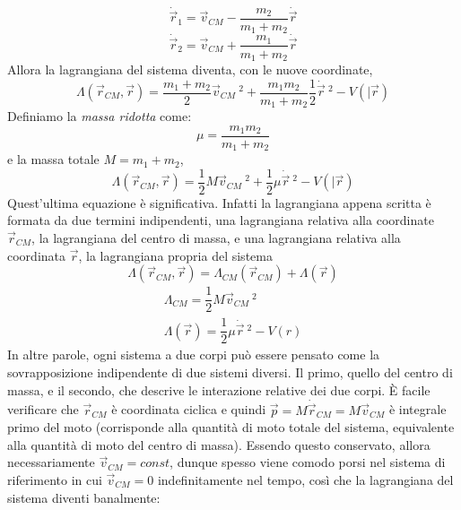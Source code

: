 \documentclass[a4paper,openany]{article}
\begin{document}
	\begin{equation}\label{key}
		\dot{\vec{r}}_1 = \vec{v}_{CM} - \dfrac{m_2}{m_1+m_2}\dot{\vec{r}}
	\end{equation}
	\begin{equation*}\label{key}
		\dot{\vec{r}}_2 = \vec{v}_{CM} + \dfrac{m_1}{m_1+m_2}\dot{\vec{r}}
	\end{equation*}
	Allora la lagrangiana del sistema diventa, con le nuove coordinate,
	\begin{equation}\label{key}
		\Lambda(\vec{r}_{CM},\vec{r}) = \dfrac{m_1+m_2}{2}\vec{v}_{CM}\>^{2} + \dfrac{m_1 m_2}{m_1 + m_2} \dfrac{1}{2} \dot{\vec{r}}\>^{2} - V(|\vec{r})
	\end{equation}
	Definiamo la \textit{massa ridotta} come:
	$$
	\mu = \dfrac{m_1 m_2}{m_1+m_2}
	$$
	e la massa totale $M = m_1+m_2$,
	\begin{equation}\label{key}
		\Lambda(\vec{r}_{CM},\vec{r}) = \dfrac{1}{2}M\vec{v}_{CM}\>^{2} + \dfrac{1}{2} \mu \dot{\vec{r}}\>^{2} - V(|\vec{r})
	\end{equation}
	Quest'ultima equazione è significativa. Infatti la lagrangiana appena scritta è formata da due termini indipendenti, una lagrangiana relativa alla coordinate $\vec{r}_{CM}$, la lagrangiana del centro di massa, e una lagrangiana relativa alla coordinata $\vec{r}$, la lagrangiana propria del sistema
	\begin{equation}\label{key}
		\Lambda(\vec{r}_{CM},\vec{r}) = \Lambda_{CM}(\vec{r}_{CM}) + \Lambda(\vec{r})
	\end{equation}
	\begin{equation}\label{key}
		\begin{aligned}
			\Lambda_{CM} = \dfrac{1}{2}M\vec{v}_{CM}\>^{2} \\
			\Lambda(\vec{r}) = \dfrac{1}{2}\mu\dot{\vec{r}}\>^{2} - V(r)
		\end{aligned}
	\end{equation}
	In altre parole, ogni sistema a due corpi può essere pensato come la sovrapposizione indipendente di due sistemi diversi. Il primo, quello del centro di massa, e il secondo, che descrive le interazione relative dei due corpi. È facile verificare che $\vec{r}_{CM}$ è coordinata ciclica e quindi $\vec{p} = M\dot{\vec{r}}_{CM} = M\vec{v}_{CM}$ è integrale primo del moto (corrisponde alla quantità di moto totale del sistema, equivalente alla quantità di moto del centro di massa). Essendo questo conservato, allora necessariamente $\vec{v}_{CM} = const$, dunque spesso viene comodo porsi nel sistema di riferimento in cui $\vec{v}_{CM} = 0$ indefinitamente nel tempo, così che la lagrangiana del sistema diventi banalmente:
\end{document}
